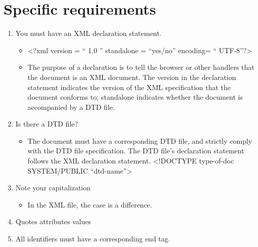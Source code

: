 \section{Specific requirements}
\begin{enumerate}
   \item You must have an XML declaration statement.
        \begin{itemize}
        \item <?xml version = “ 1.0 ” standalone = “yes/no” encoding= “ UTF-8”?>
        \item The purpose of a declaration is to tell the browser or other handlers that the document is an XML document. The version in the declaration statement indicates the version of the XML specification that the document conforms to; standalone indicates whether the document is accompanied by a DTD file. 
        \end{itemize}
   \item Is there a DTD file?
        \begin{itemize}
        \item The document must have a corresponding DTD file, and strictly comply with the DTD file specification. The DTD file's declaration statement follows the XML declaration statement.
        <!DOCTYPE type-of-doc SYSTEM/PUBLIC “dtd-name”>
        \end{itemize}
    \item Note your capitalization
        \begin{itemize}
            \item In the XML file, the case is a difference.
        \end{itemize}
    \item Quotes attributes values
    \item All identifiers must have a corresponding end tag.
\end{enumerate}

